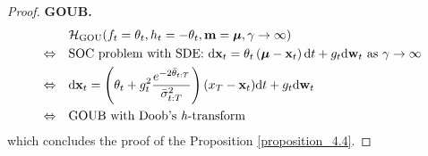 \begin{proof}
\textbf{GOUB.}
\begin{align*}
&\mathcal{H}_\text{GOU}(f_t=\theta_t, h_t=-\theta_t, \mathbf{m} = \boldsymbol{\mu}, \gamma \rightarrow \infty) \\
\Leftrightarrow \quad & \text{SOC problem with SDE: }\mathrm{d}\mathbf{x}_t = \theta_t\left(\boldsymbol{\mu}-\mathbf{x}_t \right) \mathrm{d} t + g_t \mathrm{d}\mathbf{w}_t \text{ as $\gamma \rightarrow \infty$}\\
\Leftrightarrow \quad & \mathrm{d} \mathbf{x}_t = \left( \theta_t + g^2_t \frac{e^{-2\bar{\theta}_{t:T}}}{\bar{\sigma}^2_{t:T}}\right) (x_T - \mathbf{x}_t) \mathrm{d} t + g_t \mathrm{d} \mathbf{w}_t \\
\Leftrightarrow \quad & \text{GOUB with Doob's \textit{h}-transform}
\end{align*}
which concludes the proof of the Proposition \ref{proposition_4.4}.



\end{proof}
